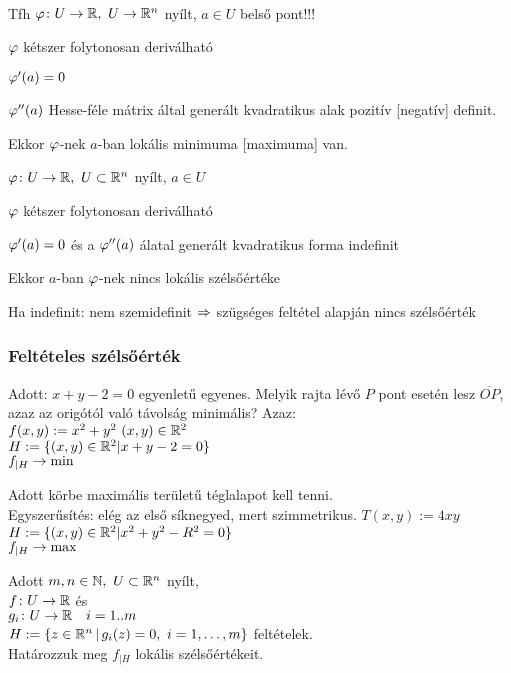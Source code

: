 \begin{te}\ \\
  Tfh $\varphi\colon U\to\mathbb{R},\ U\to\mathbb{R}^n$ nyílt, $a\in U$ belső pont!!!
    \begin{enumzjr}
    \item $\varphi$ kétszer folytonosan deriválható
    \item $\varphi'(a)=0$
    \item $\varphi''(a)$ Hesse-féle mátrix által generált kvadratikus alak pozitív [negatív] definit.
    \end{enumzjr}
Ekkor $\varphi$-nek $a$-ban lokális minimuma [maximuma] van.
\end{te}

\begin{te}
  $\varphi\colon U\to\mathbb{R},\ U\subset \mathbb{R}^n$ nyílt, $a\in U$
\begin{enumzjr}
\item $\varphi$ kétszer folytonosan deriválható
\item $\varphi'(a)=0$ és a $\varphi''(a)$ álatal generált kvadratikus forma indefinit
\end{enumzjr}
Ekkor $a$-ban $\varphi$-nek nincs lokális szélsőértéke
\end{te}
\begin{biz}
  Ha indefinit: nem szemidefinit $\Rightarrow$ szügséges feltétel alapján nincs szélsőérték
\end{biz}

\subsubsection{Feltételes szélsőérték}
\begin{PlSS}
  Adott: $x+y-2=0$ egyenletű egyenes. Melyik rajta lévő $P$ pont esetén lesz $\overline{OP}$, azaz az origótól való
  távolság minimális? Azaz:\\
  $f(x,y) := x^2 + y^2\ (x,y)\in\R^2$\\
  $H:=\{(x,y)\in\mathbb{R}^2| x+y-2=0\}$\\
  $f_{|H}\to\min$
\end{PlSS}
\begin{PlSS}\label{plss:fsz2}
  Adott körbe maximális területű téglalapot kell tenni.\\
  Egyszerűsítés: elég az első síknegyed, mert szimmetrikus.
  $T(x,y) := 4xy$\\
  $H:=\{(x,y)\in\mathbb{R}^2| x^2 + y^2 - R^2 =0\}$\\
  $f_{|H}\to\max$
\end{PlSS}
Adott $m,n\in\mathbb{N},\ U\subset\mathbb{R}^n$ nyílt,\\
$f\colon U\to\mathbb{R}$ és\\
$g_i\colon U\to\mathbb{R}\quad i=1..m$\\
$H:=\{ z\in\R^n\,|\,g_i(z)=0,\ i=1,\dotsc,m\}$ feltételek.\\
Határozzuk meg $f_{|H}$ lokális szélsőértékeit.

